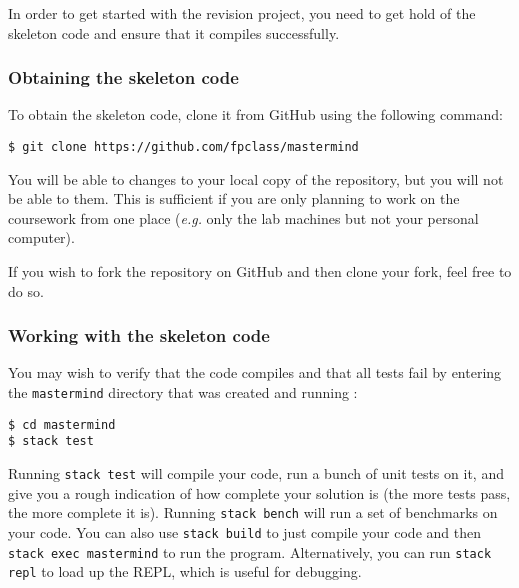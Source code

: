 In order to get started with the revision project, you need to get hold of the skeleton code and ensure that it compiles successfully. 

\subsubsection{Obtaining the skeleton code}

To obtain the skeleton code, clone it from GitHub using the following command:
\begin{verbatim}
$ git clone https://github.com/fpclass/mastermind
\end{verbatim}
You will be able to  changes to your local copy of the repository, but you will not be able to  them. This is sufficient if you are only planning to work on the coursework from one place (\emph{e.g.} only the lab machines but not your personal computer).

If you wish to fork the repository on GitHub and then clone your fork, feel free to do so.

\subsubsection{Working with the skeleton code}

You may wish to verify that the code compiles and that all tests fail by entering the \texttt{\small mastermind} directory that was created and running :
\begin{verbatim}
$ cd mastermind
$ stack test
\end{verbatim}
Running \texttt{stack test} will compile your code, run a bunch of unit tests on it, and give you a rough indication of how complete your solution is (the more tests pass, the more complete it is). Running \texttt{stack bench} will run a set of benchmarks on your code. You can also use \texttt{stack build} to just compile your code and then \texttt{stack exec mastermind} to run the program. Alternatively, you can run \texttt{stack repl} to load up the REPL, which is useful for debugging.

